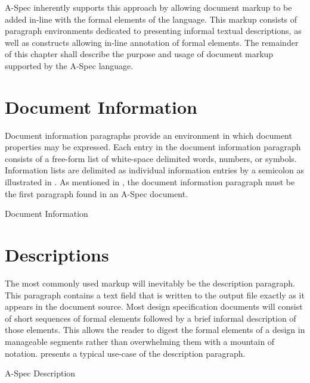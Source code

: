 \documentclass[letterpaper,10pt,draft]{book}
\begin{document}
A-Spec inherently supports this approach by allowing document markup to be added
in-line with the formal elements of the language.  This markup consists of paragraph
environments dedicated to presenting informal textual descriptions, as well as constructs
allowing in-line annotation of formal elements.  The remainder of this chapter shall
describe the purpose and usage of document markup supported by the A-Spec language.

\section{Document Information}
   \label{sect:DocInfo}

Document information paragraphs provide an environment in which document properties
may be expressed.  Each entry in the document information paragraph consists of
a free-form list of white-space delimited words, numbers, or symbols.  Information
lists are delimited as individual information entries by a semicolon as illustrated
in .  As mentioned in , the document information
paragraph must be the first paragraph found in an A-Spec document.

\begin{example}
   

   \caption{Document Information}
   \label{ex:DocInfo}
\end{example}

\section{Descriptions}
   \label{sect:Descriptions}

The most commonly used markup will inevitably be the description paragraph.  This
paragraph contains a text field that is written to the output file exactly as it
appears in the document source.  Most design specification documents will consist
of short sequences of formal elements followed by a brief informal description of
those elements.  This allows the reader to digest the formal elements of a design
in manageable segments rather than overwhelming them with a mountain of notation.
 presents a typical use-case of the description paragraph.

\begin{example}
\begin{minipage}[t]{0.55\linewidth}
   
\end{minipage}
\begin{minipage}[t]{0.44\linewidth}
   \azsch
   
\end{minipage}

   \caption{A-Spec Description}
   \label{ex:Desc}
\end{example}
\end{document}

